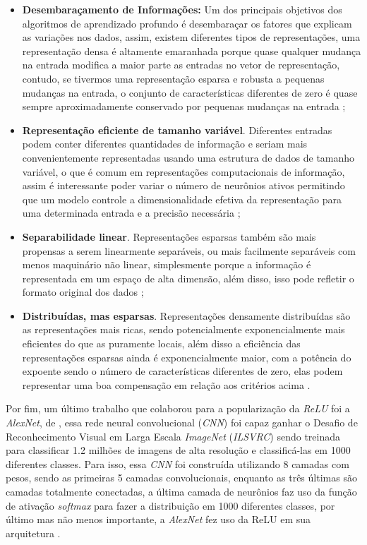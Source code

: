 \begin{itemize}
    \item \textbf{Desembaraçamento de Informações:} Um dos principais objetivos dos algoritmos de aprendizado profundo é desembaraçar os fatores que explicam as variações nos dados, assim, existem diferentes tipos de representações, uma representação densa é altamente emaranhada porque quase qualquer mudança na entrada modifica a maior parte as entradas no vetor de representação, contudo, se tivermos uma representação esparsa e robusta a pequenas mudanças na entrada, o conjunto de características diferentes de zero é quase sempre aproximadamente conservado por pequenas mudanças na entrada \parencite{Glorot};
    \item \textbf{Representação eficiente de tamanho variável}. Diferentes entradas podem conter diferentes quantidades de informação e seriam mais convenientemente representadas usando uma estrutura de dados de tamanho variável, o que é comum em representações computacionais de informação, assim é interessante poder variar o número de neurônios ativos permitindo que um modelo controle a dimensionalidade efetiva da representação para uma determinada entrada e a precisão necessária \parencite{Glorot};
    \item \textbf{Separabilidade linear}. Representações esparsas também são mais propensas a serem linearmente separáveis, ou mais facilmente separáveis com menos maquinário não linear, simplesmente porque a informação é representada em um espaço de alta dimensão, além disso, isso pode refletir o formato original dos dados \parencite{Glorot};
    \item \textbf{Distribuídas, mas esparsas}. Representações densamente distribuídas são as representações mais ricas, sendo potencialmente exponencialmente mais eficientes do que as puramente locais, além disso a eficiência das representações esparsas ainda é exponencialmente maior, com a potência do expoente sendo o número de características diferentes de zero, elas podem representar uma boa compensação em relação aos critérios acima \parencite{Glorot}.
\end{itemize}


Por fim, um último trabalho que colaborou para a popularização da \textit{ReLU} foi a \textit{AlexNet}, de \textcite{AlexNet}, essa rede neural convolucional (\textit{CNN}) foi capaz ganhar o Desafio de Reconhecimento Visual em Larga Escala \textit{ImageNet} (\textit{ILSVRC}) sendo treinada para classificar 1.2 milhões de imagens de alta resolução e classificá-las em 1000 diferentes classes. Para isso, essa \textit{CNN} foi construída utilizando 8 camadas com pesos, sendo as primeiras 5 camadas convolucionais, enquanto as três últimas são camadas totalmente conectadas, a última camada de neurônios faz uso da função de ativação \textit{softmax} para fazer a distribuição em 1000 diferentes classes, por último mas não menos importante, a \textit{AlexNet} fez uso da ReLU em sua arquitetura \parencite{AlexNet}.


